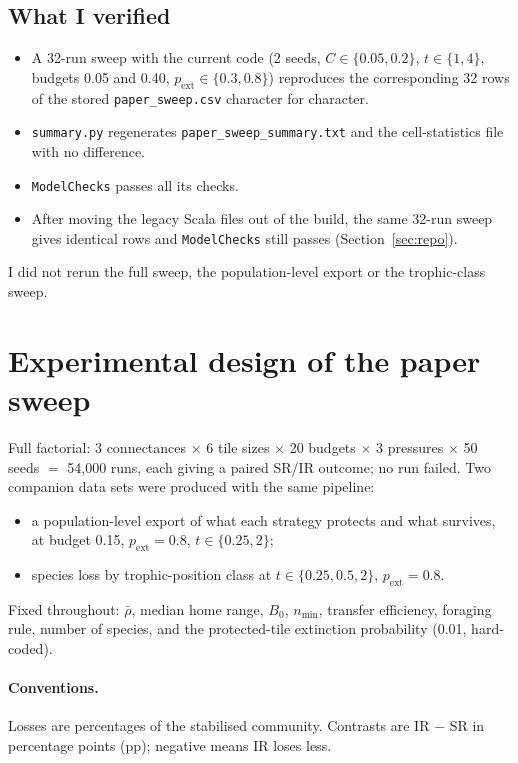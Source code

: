\documentclass[11pt,a4paper]{article}
\newcommand{\code}[1]{\texttt{\small #1}}
\newcommand{\rhobar}{\bar{\rho}}
\begin{document}
\subsection{What I verified}\label{sec:verified}
\begin{itemize}
\item A 32-run sweep with the current code (2 seeds, $C\in\{0.05,0.2\}$, $t\in\{1,4\}$, budgets 0.05 and
0.40, $p_\text{ext}\in\{0.3,0.8\}$) reproduces the corresponding 32 rows of the stored
\code{paper\_sweep.csv} character for character.
\item \code{summary.py} regenerates \code{paper\_sweep\_summary.txt} and the cell-statistics file with no
difference.
\item \code{ModelChecks} passes all its checks.
\item After moving the legacy Scala files out of the build, the same 32-run sweep gives identical rows
and \code{ModelChecks} still passes (Section~\ref{sec:repo}).
\end{itemize}
I did not rerun the full sweep, the population-level export or the trophic-class sweep.

\section{Experimental design of the paper sweep}

Full factorial: 3 connectances $\times$ 6 tile sizes $\times$ 20 budgets $\times$ 3 pressures $\times$ 50
seeds $=$ 54,000 runs, each giving a paired SR/IR outcome; no run failed. Two companion data sets were
produced with the same pipeline:
\begin{itemize}
\item a population-level export of what each strategy protects and what survives, at budget 0.15,
$p_\text{ext}=0.8$, $t\in\{0.25,2\}$;
\item species loss by trophic-position class at $t\in\{0.25,0.5,2\}$, $p_\text{ext}=0.8$.
\end{itemize}
Fixed throughout: $\rhobar$, median home range, $B_0$, $n_{\min}$, transfer efficiency, foraging rule, number
of species, and the protected-tile extinction probability (0.01, hard-coded).

\paragraph{Conventions.} Losses are percentages of the stabilised community. Contrasts are IR $-$ SR in
percentage points (pp); negative means IR loses less.
\end{document}
